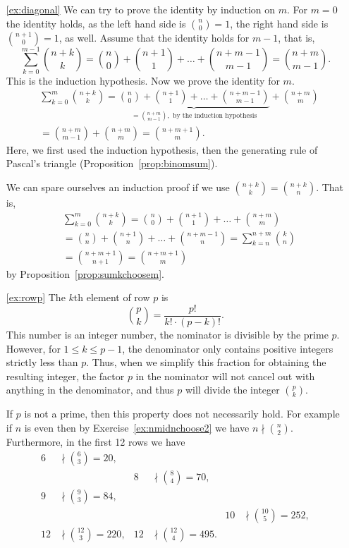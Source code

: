 \begin{enumerate}
\item[\ref{ex:diagonal}]
We can try to prove the identity by induction on $m$. 
For $m=0$ the identity holds, as the left hand side is $\binom{n}{0} = 1$, 
the right hand side is $\binom{n+1}{0} = 1$, as well. 
Assume that the identity holds for $m-1$, that is, 
\[
\sum_{k=0}^{m-1} \binom{n+k}{k} = \binom{n}{0} + \binom{n+1}{1} + \dots + \binom{n+m-1}{m-1} = \binom{n+m}{m-1}. 
\]
This is the induction hypothesis. 
Now we prove the identity for $m$. 
\begin{align*}
& \sum_{k=0}^{m} \binom{n+k}{k} = \underbrace{\binom{n}{0} + \binom{n+1}{1} + \dots + \binom{n+m-1}{m-1}}_{= \binom{n+m}{m-1}, \text{ by the induction hypothesis}} + \binom{n+m}{m} \\
&= \binom{n+m}{m-1} + \binom{n+m}{m} = \binom{n+m+1}{m}. 
\end{align*}
Here, we first used the induction hypothesis, 
then the generating rule of Pascal's triangle (Proposition~\ref{prop:binomsum}). 

We can spare ourselves an induction proof if we use $\binom{n+k}{k} = \binom{n+k}{n}$. 
That is, 
\begin{align*}
&\sum_{k=0}^{m} \binom{n+k}{k} = \binom{n}{0} + \binom{n+1}{1} + \dots + \binom{n+m}{m} \\ 
&= \binom{n}{n} + \binom{n+1}{n} + \dots + \binom{n+m-1}{n} = \sum_{k=n}^{n+m} \binom{k}{n} \\
&= \binom{n+m+1}{n+1} = \binom{n+m+1}{m} 
\end{align*}
by Proposition~\ref{prop:sumkchoosem}. 

\item[\ref{ex:rowp}]
The $k$th element of row $p$ is 
\[
\binom{p}{k} = \frac{p!}{k!\cdot (p-k)!}. 
\]
This number is an integer number, the nominator is divisible by the prime $p$. 
However, for $1\leq k\leq p-1$, the denominator only contains positive integers strictly less than $p$. 
Thus, when we simplify this fraction for obtaining the resulting integer, 
the factor $p$ in the nominator will not cancel out with anything in the denominator, 
and thus $p$ will divide the integer $\binom{p}{k}$. 

If $p$ is not a prime, 
then this property does not necessarily hold.
For example if $n$ is even then by Exercise~\ref{ex:nmidnchoose2} we have $n \nmid \binom{n}{2}$. 
Furthermore, in the first 12 rows we have 
\begin{align*}
6 &\nmid \binom{6}{3} = 20, \\
&& 8 &\nmid \binom{8}{4} = 70, \\
9 &\nmid \binom{9}{3} = 84, \\
&& && 10 &\nmid \binom{10}{5} = 252, \\
12 &\nmid \binom{12}{3} = 220, & 12 &\nmid \binom{12}{4} = 495. 
\end{align*}




\end{enumerate}

